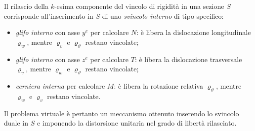 \begin{oss}
	Il rilascio della $k$-esima componente del vincolo di
	rigidità in una sezione $S$ corrisponde all'inserimento
	in $S$ di uno \emph{svincolo interno} di tipo specifico:
	\begin{itemize}[noitemsep]
		\item \emph{glifo interno} con asse $y^e$ per
		calcolare $N$: è libera la dislocazione
		longitudinale $\varrho_w$, mentre $\varrho_v$ e
		$\varrho_\vartheta$ restano vincolate;
		\item \emph{glifo interno} con asse $z^e$ per
		calcolare $T$: è libera la dislocazione trasversale
		$\varrho_v$, mentre $\varrho_w$ e $\varrho_\vartheta$
		restano vincolate;
		\item \emph{cerniera interna} per calcolare $M$: è
		libera la rotazione relativa $\varrho_\vartheta$,
		mentre $\varrho_w$ e $\varrho_v$ restano vincolate.
	\end{itemize}
	Il problema virtuale è pertanto un meccanismo ottenuto
	inserendo lo svincolo duale in $S$ e imponendo la
	distorsione unitaria nel grado di libertà rilasciato.
\end{oss}


